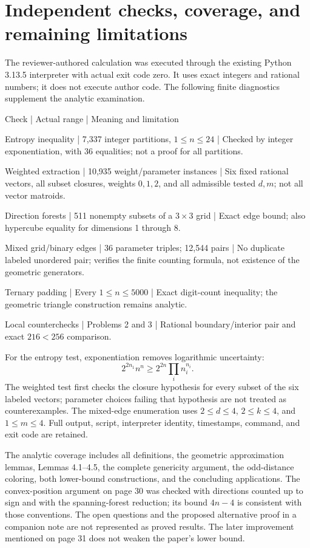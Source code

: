 \documentclass[10pt]{article}
\begin{document}
\section*{Independent checks, coverage, and remaining limitations}
The reviewer-authored calculation was executed through the existing Python 3.13.5 interpreter with actual exit code zero. It uses exact integers and rational numbers; it does not execute author code. The following finite diagnostics supplement the analytic examination.\par
Check | Actual range | Meaning and limitation\par
Entropy inequality | 7,337 integer partitions, \(1\le n\le24\) | Checked by integer exponentiation, with 36 equalities; not a proof for all partitions.\par
Weighted extraction | 10,935 weight/parameter instances | Six fixed rational vectors, all subset closures, weights \(0,1,2\), and all admissible tested \(d,m\); not all vector matroids.\par
Direction forests | 511 nonempty subsets of a \(3\times3\) grid | Exact edge bound; also hypercube equality for dimensions 1 through 8.\par
Mixed grid/binary edges | 36 parameter triples; 12,544 pairs | No duplicate labeled unordered pair; verifies the finite counting formula, not existence of the geometric generators.\par
Ternary padding | Every \(1\le n\le5000\) | Exact digit-count inequality; the geometric triangle construction remains analytic.\par
Local counterchecks | Problems 2 and 3 | Rational boundary/interior pair and exact \(216<256\) comparison.\par
For the entropy test, exponentiation removes logarithmic uncertainty: \[2^{2n_1}n^n\ge 2^{2n}\prod_i n_i^{n_i}.\] The weighted test first checks the closure hypothesis for every subset of the six labeled vectors; parameter choices failing that hypothesis are not treated as counterexamples. The mixed-edge enumeration uses \(2\le d\le4\), \(2\le k\le4\), and \(1\le m\le4\). Full output, script, interpreter identity, timestamps, command, and exit code are retained.\par
The analytic coverage includes all definitions, the geometric approximation lemmas, Lemmas 4.1–4.5, the complete genericity argument, the odd-distance coloring, both lower-bound constructions, and the concluding applications. The convex-position argument on page 30 was checked with directions counted up to sign and with the spanning-forest reduction; its bound \(4n-4\) is consistent with those conventions. The open questions and the proposed alternative proof in a companion note are not represented as proved results. The later improvement mentioned on page 31 does not weaken the paper’s lower bound.\par
\end{document}
